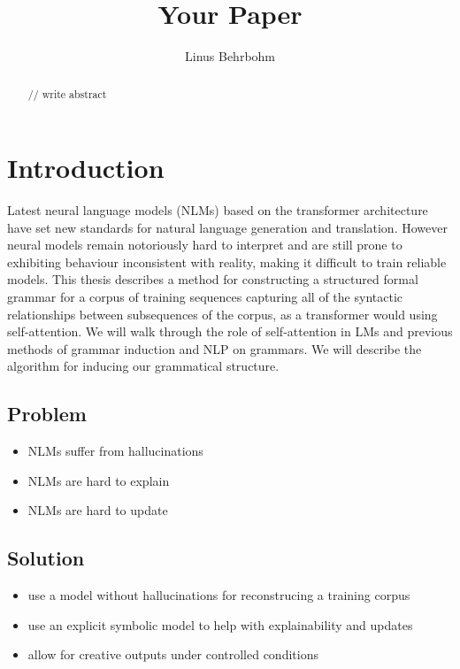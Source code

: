 \documentclass[10pt]{report}
\title{Your Paper}
\author{Linus Behrbohm}
\begin{document}
\maketitle

\begin{abstract}
// write abstract

\end{abstract}

\newpage

\renewcommand*\contentsname{Outline}
\tableofcontents

\newpage

\chapter{Introduction}
Latest neural language models (NLMs) based on the transformer architecture have set new 
standards for natural language generation and translation. However neural models  
remain notoriously hard to interpret and are still prone to exhibiting behaviour 
inconsistent with reality, making it difficult to train reliable models.
This thesis describes a method for constructing a structured formal grammar for a corpus 
of training sequences capturing all of the syntactic relationships between subsequences 
of the corpus, as a transformer would using self-attention.
We will walk through the role of self-attention in LMs and previous methods
of grammar induction and NLP on grammars. We will describe the 
algorithm for inducing our grammatical structure.

\section{Problem}
\begin{itemize}
    \item NLMs suffer from hallucinations
    \item NLMs are hard to explain
    \item NLMs are hard to update
\end{itemize}
\section{Solution}
\begin{itemize}
    \item use a model without hallucinations for reconstrucing a training corpus
    \item use an explicit symbolic model to help with explainability and updates
    \item allow for creative outputs under controlled conditions
\end{itemize}
\end{document}
